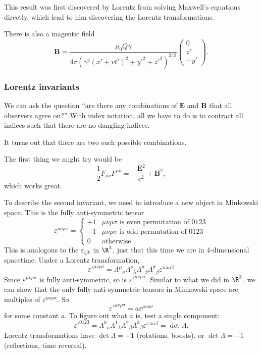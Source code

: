 \documentclass[a4paper]{article}
\begin{document}
\begin{eg}
  This result was first discovered by Lorentz from solving Maxwell's equations directly, which lead to him discovering the Lorentz transformations.

  There is also a magentic field
  \[
    \mathbf{B} = \frac{\mu_0 Q\gamma}{4\pi(\gamma^2(x' + vt')^2 + y'^2 + z'^2)^{3/2}}
    \begin{pmatrix}
      0\\z'\\-y'
    \end{pmatrix}.
  \]
\end{eg}

\subsubsection*{Lorentz invariants}
We can ask the question ``are there any combinations of $\mathbf{E}$ and $\mathbf{B}$ that all observers agree on?'' With index notation, all we have to do is to contract all indices such that there are no dangling indices.

It turns out that there are two such possible combinations.

The first thing we might try would be
\[
  \frac{1}{2}F_{\mu\nu}F^{\mu\nu} = -\frac{\mathbf{E}^2}{c^2} + \mathbf{B}^2,
\]
which works great.

To describe the second invariant, we need to introduce a new object in Minkowski space. This is the fully anti-symmetric tensor
\[
  \varepsilon^{\mu\nu\rho\sigma} =
  \begin{cases}
    +1 & \mu\nu\rho\sigma\text{ is even permutation of 0123}\\
    -1 & \mu\nu\rho\sigma\text{ is odd permutation of 0123}\\
    0 & \text{otherwise}
  \end{cases}
\]
This is analogous to the $\varepsilon_{ijk}$ in $\R^3$, just that this time we are in 4-dimensional spacetime. Under a Lorentz transformation,
\[
  \varepsilon'^{\mu\nu\rho\sigma} = \Lambda^\mu\!_\kappa\Lambda^\nu\!_\lambda \Lambda^\sigma\!_\beta \Lambda^\sigma\!_\beta \varepsilon^{\kappa\lambda\alpha\beta}
\]
Since $\varepsilon^{\mu\nu\rho\sigma}$ is fully anti-symmetric, so is $\varepsilon'^{\mu\nu\rho\sigma}$. Similar to what we did in $\R^3$, we can show that the only fully anti-symmetric tensors in Minkowski space are multiples of $\varepsilon^{\mu\nu\rho\sigma}$. So
\[
  \varepsilon'^{\mu\nu\rho\sigma} = a \varepsilon^{\mu\nu\rho\sigma}
\]
for some constant $a$. To figure out what $a$ is, test a single component:
\[
  \varepsilon'^{0123} = \Lambda^0\!_\kappa\Lambda^1\!_\lambda \Lambda^2\!_\beta \Lambda^3\!_\beta \varepsilon^{\kappa\lambda\alpha\beta} = \det \Lambda.
\]
Lorentz transformations have $\det \Lambda = +1$ (rotations, boosts), or $\det \Lambda = -1$ (reflections, time reversal).
\end{document}
